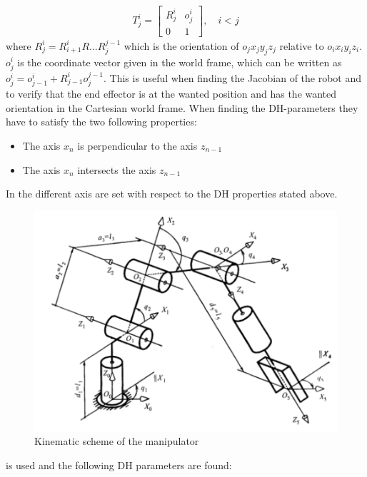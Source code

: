  \begin{align*}
      T^i_j = 
      \begin{bmatrix}
          R^i_j & o^i_j\\
          0&1
      \end{bmatrix}, \quad i<j
 \end{align*}
 where $R^i_j = R^i_{i+1}R...R^{j-1}_j$ which is the orientation of $o_jx_jy_jz_j$ relative to $o_ix_iy_iz_i$. $o^i_j$ is the coordinate vector given in the world frame, which can be written as $o^i_j = o^i_{j-1}+R^{i}_{j-1}o^{j-1}_j$. This is useful when finding the Jacobian of the robot and to verify that the end effector is at the wanted position and has the wanted orientation in the Cartesian world frame. When finding the DH-parameters they have to satisfy the two following properties\cite{spong}:
 \begin{itemize}
     \item The axis $x_n$ is perpendicular to the axis $z_{n-1}$
     \item The axis $x_n$ intersects the axis $z_{n-1}$
 \end{itemize}

In  the different axis are set with respect to the DH properties stated above\cite{Kinematics}.

\begin{figure}[htbp]
  \centering
  \includegraphics[width=.9\textwidth]{img/DHconv.png}
  \caption[Kinematic scheme of the manipulator]{Kinematic scheme of the manipulator\cite{Kinematics}}
  \label{fig:dhf}
\end{figure}%

 is used and the following DH parameters are found:

